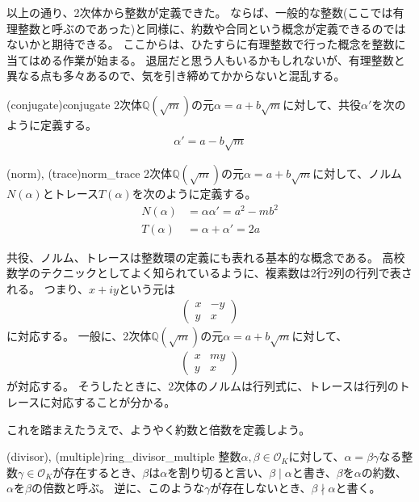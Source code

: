 以上の通り、2次体から整数が定義できた。
ならば、一般的な整数(ここでは有理整数と呼ぶのであった)と同様に、約数や合同という概念が定義できるのではないかと期待できる。
ここからは、ひたすらに有理整数で行った概念を整数に当てはめる作業が始まる。
退屈だと思う人もいるかもしれないが、有理整数と異なる点も多々あるので、気を引き締めてかからないと混乱する。

\begin{Defi}{(conjugate)}{conjugate}
2次体$\mathbb{Q}(\sqrt{m})$の元$\alpha=a+b\sqrt{m}$に対して、共役$\alpha'$を次のように定義する。
\begin{align*}
\alpha' = a - b\sqrt{m}
\end{align*}
\end{Defi}

\begin{Defi}{(norm), (trace)}{norm_trace}
2次体$\mathbb{Q}(\sqrt{m})$の元$\alpha=a+b\sqrt{m}$に対して、ノルム$N(\alpha)$とトレース$T(\alpha)$を次のように定義する。
\begin{align*}
N(\alpha) &= \alpha\alpha' = a^2 - mb^2\\
T(\alpha) &= \alpha + \alpha' = 2a
\end{align*}
\end{Defi}

共役、ノルム、トレースは整数環の定義にも表れる基本的な概念である。
高校数学のテクニックとしてよく知られているように、複素数は2行2列の行列で表される。
つまり、$x+iy$という元は
\begin{align*}
\begin{pmatrix}
x & -y \\
y & x
\end{pmatrix}
\end{align*}
に対応する。
一般に、2次体$\mathbb{Q}(\sqrt{m})$の元$\alpha=a+b\sqrt{m}$に対して、
\begin{align*}
\begin{pmatrix}
x & my \\
y & x
\end{pmatrix}
\end{align*}
が対応する。
そうしたときに、2次体のノルムは行列式に、トレースは行列のトレースに対応することが分かる。

これを踏まえたうえで、ようやく約数と倍数を定義しよう。

\begin{Defi}{(divisor), (multiple)}{ring_divisor_multiple}
整数$\alpha,\beta\in\mathcal{O}_K$に対して、$\alpha=\beta\gamma$なる整数$\gamma\in\mathcal{O}_K$が存在するとき、$\beta$は$\alpha$を割り切ると言い、$\beta \mid \alpha$と書き、$\beta$を$\alpha$の約数、$\alpha$を$\beta$の倍数と呼ぶ。
逆に、このような$\gamma$が存在しないとき、$\beta \nmid \alpha$と書く。
\end{Defi}

